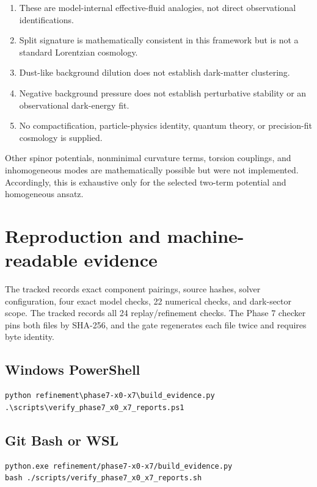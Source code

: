\documentclass[11pt]{article}
\begin{document}
\begin{enumerate}
\item These are model-internal effective-fluid analogies, not direct observational
identifications.

\item Split signature \texttt{} is mathematically consistent in this framework but
is not a standard Lorentzian cosmology.

\item Dust-like background dilution does not establish dark-matter clustering.
\item Negative background pressure does not establish perturbative stability or
an observational dark-energy fit.

\item No compactification, particle-physics identity, quantum theory, or
precision-fit cosmology is supplied.

\end{enumerate}

Other spinor potentials, nonminimal curvature terms, torsion couplings, and inhomogeneous modes are mathematically possible but were not implemented. Accordingly, this is exhaustive only for the selected two-term potential and homogeneous ansatz.

\section{Reproduction and machine-readable evidence}

The tracked \texttt{} records exact component pairings, source hashes, solver configuration, four exact model checks, 22 numerical checks, and dark-sector scope. The tracked \texttt{} records all 24 replay/refinement checks. The Phase 7 checker pins both files by SHA-256, and the gate regenerates each file twice and requires byte identity.

\subsection{Windows PowerShell}

\begin{Verbatim}[fontsize=\small]
python refinement\phase7-x0-x7\build_evidence.py
.\scripts\verify_phase7_x0_x7_reports.ps1
\end{Verbatim}

\subsection{Git Bash or WSL}

\begin{Verbatim}[fontsize=\small]
python.exe refinement/phase7-x0-x7/build_evidence.py
bash ./scripts/verify_phase7_x0_x7_reports.sh
\end{Verbatim}
\end{document}
